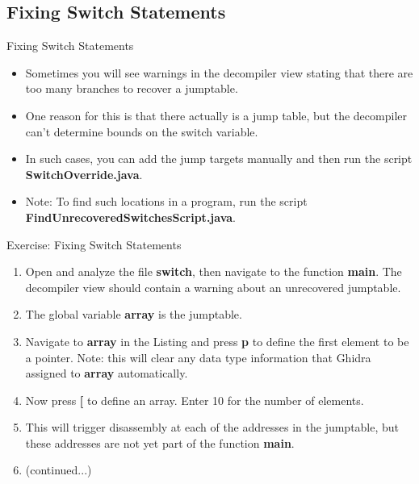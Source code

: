 \documentclass{beamer}
\begin{document}
\subsection{Fixing Switch Statements}
\begin{frame}
\begin{block}{Fixing Switch Statements}
\begin{itemize}
\item Sometimes you will see warnings in the decompiler view stating that there are too many branches to recover a jumptable.
\item One reason for this is that there actually is a jump table, but the decompiler can't determine bounds on the switch variable.
\item In such cases, you can add the jump targets manually and then run the script \textbf{SwitchOverride.java}.
\item Note: To find such locations in a program, run the script \textbf{FindUnrecoveredSwitchesScript.java}.
\end{itemize}
\end{block}
\end{frame}

\begin{frame}
\begin{block}{Exercise: Fixing Switch Statements}
\begin{enumerate}
\item Open and analyze the file \textbf{switch}, then navigate to the function \textbf{main}. The decompiler view should contain a warning about an unrecovered jumptable.
\item The global variable \textbf{array} is the jumptable.
\item Navigate to \textbf{array} in the Listing and press \textbf{p} to define the first element to be a pointer.  Note: this will clear any data type information that Ghidra assigned to
\textbf{array} automatically.
\item Now press \textbf{[} to define an array.  Enter 10 for the number of elements.
\item This will trigger disassembly at each of the addresses in the jumptable, but these addresses are not yet part of the function \textbf{main}.
\item[] (continued...)
\end{enumerate}
\end{block}
\end{frame}
\end{document}
